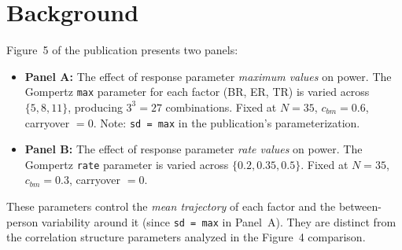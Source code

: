\documentclass[11pt]{article}
\begin{document}
\maketitle
\thispagestyle{fancy}

\begin{abstract}
Figure~5 of Hendrickson et al.\ (2020) explores how the
response trajectory parameters (Gompertz maximum and rate
for each of three factors) affect statistical power to
detect a biomarker--treatment interaction across four trial
designs. This paper reproduces Figure~5 using both the
original publication code and the revised code, comparing
the results to assess how the methodological corrections
(AR(1) autocorrelation, exponential correlation decay,
\texttt{nlme::lme} with \texttt{corCAR1}) affect the
sensitivity of power to response parameter choices. Both
simulations use 200 replicates per cell.
\end{abstract}

\tableofcontents
\newpage

\section{Background}

Figure~5 of the publication presents two panels:

\begin{itemize}
\item \textbf{Panel A:} The effect of response parameter
  \emph{maximum values} on power. The Gompertz \texttt{max}
  parameter for each factor (BR, ER, TR) is varied across
  $\{5, 8, 11\}$, producing $3^3 = 27$ combinations.
  Fixed at $N = 35$, $c_{bm} = 0.6$, carryover $= 0$.
  Note: \texttt{sd = max} in the publication's
  parameterization.

\item \textbf{Panel B:} The effect of response parameter
  \emph{rate values} on power. The Gompertz \texttt{rate}
  parameter is varied across $\{0.2, 0.35, 0.5\}$.
  Fixed at $N = 35$, $c_{bm} = 0.3$, carryover $= 0$.
\end{itemize}

These parameters control the \emph{mean trajectory} of
each factor and the between-person variability around it
(since \texttt{sd = max} in Panel~A). They are distinct
from the correlation structure parameters analyzed in the
Figure~4 comparison.
\end{document}
